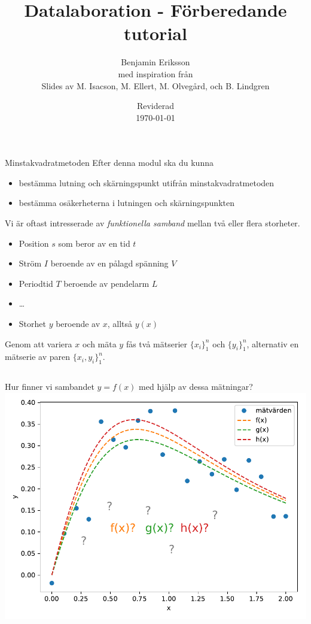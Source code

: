 \documentclass[9pt]{beamer}
\title{Datalaboration - Förberedande tutorial}
\author[benjamin.eriksson@physics.uu.se]{Benjamin Eriksson  \\ \tiny{med inspiration från} \\ \scriptsize{Slides av M. Isacson, M. Ellert, M. Olvegård, och B. Lindgren}}
\institute[Uppsala universitet]{{\small Avdelningen för tillämpad kärnfysik \\ Institutionen för fysik och astronomi} \\ \uulogo}
\date{{\small Reviderad}\\ \today}
\begin{document}
    \begin{frame}{Minstakvadratmetoden}
        Efter denna modul ska du kunna
        \begin{itemize}
            \item bestämma lutning och skärningspunkt utifrån minstakvadratmetoden
            \item bestämma osäkerheterna i lutningen och skärningspunkten
        \end{itemize}
    \end{frame}

    \begin{frame}
        Vi är oftast intresserade av \emph{funktionella samband} mellan två
        eller flera storheter. 

        \begin{itemize}
            \item Position $s$ som beror av en tid $t$
            \item Ström $I$ beroende av en pålagd spänning $V$
            \item Periodtid $T$ beroende av pendelarm $L$
            \item \ldots
            \item Storhet $y$ beroende av $x$, alltså $y(x)$
        \end{itemize}

        Genom att variera $x$ och mäta $y$ fås två mätserier $\{x_i\}_1^n$ och
        $\{y_i\}_1^n$, alternativ en mätserie av paren $\{x_i,y_i\}_1^n$.

        \vfill
        \begin{columns}
            Hur finner vi sambandet $y=f(x)$ med hjälp av dessa mätningar?
            \includegraphics[width=\textwidth]{anpassning0.pdf}
        \end{columns}

    \end{frame}
\end{document}

